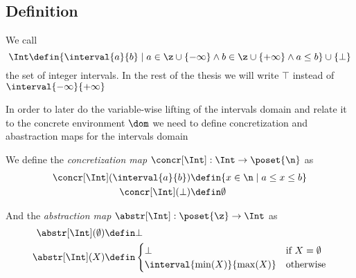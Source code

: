 \subsection{Definition}
\label{sub:intervals}


\begin{definition}\label{def:int}
  We call
  \begin{equation*}
    \Int \defin \{ \interval{a}{b} \mid a \in \z \cup \{-\infty\}
    \wedge b \in \z \cup \{+\infty\} \wedge a\leq b \} \cup
    \{\bot\} 
  \end{equation*}
  the set of integer intervals. In the rest of the thesis we will
  write \(\top\) instead of \(\interval{-\infty}{+\infty}\)
\end{definition}

In order to later do the variable-wise lifting of the intervals domain
and relate it to the concrete environment \(\dom\) we need to define
concretization and abastraction maps for the intervals domain

\begin{definition}\label{def:concrint}
  We define the \emph{concretization map} \(\concr[\Int] : \Int \to
  \poset{\n}\) as
  \begin{align*}
    \concr[\Int](\interval{a}{b}) & \defin \{x\in \n \mid a \leq x \leq b\} \\
    \concr[\Int](\bot) & \defin \emptyset
  \end{align*}

  And the \emph{abstraction map} \(\abstr[\Int]:\poset{\z} \to \Int\) as
  \begin{align*}
    \abstr[\Int](\emptyset) & \defin \bot \\
    \abstr[\Int](X) & \defin
    \begin{cases}
      \bot & \text{if } X = \emptyset \\
      \interval{\min(X)}{\max(X)} & \text{otherwise}
    \end{cases}
  \end{align*}
\end{definition}

